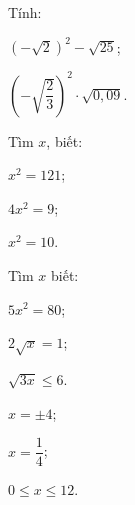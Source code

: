 \begin{bt} %
	Tính:
	\begin{enumEX}{2}
	\item $(-\sqrt{2})^{2}-\sqrt{25}$;
	\item $\left(-\sqrt{\dfrac{2}{3}}\right)^{2} \cdot \sqrt{0{,}09}$.
	\end{enumEX}
\end{bt}
\begin{bt}
	Tìm $x$, biết:
	\begin{listEX}[3]
	\item $x^{2}=121$;
	\item $4 x^{2}=9$;
	\item $x^{2}=10$.
	\end{listEX}
\end{bt}
\begin{bt}%
	Tìm $x$ biết:
	\begin{listEX}[3]
	\item $5x^2=80$;
	\item $2\sqrt{x}=1$;
	\item $\sqrt{3x}\leq 6$.
	\end{listEX}
	\loigiai
	{
	\begin{listEX}[3]
	\item $x=\pm 4$;
	\item $x=\dfrac{1}{4}$;
	\item $0\leq x\leq 12$.
	\end{listEX}}
\end{bt}

